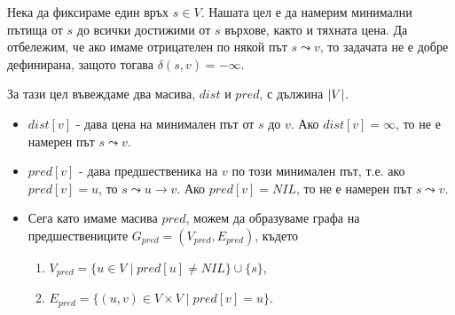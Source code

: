 Нека да фиксираме един връх $s \in V$.
Нашата цел е да намерим минимални пътища от $s$ до всички достижими от $s$ върхове,
както и тяхната цена. 
Да отбележим, че ако имаме отрицателен по някой път $s \leadsto v$, то задачата не е добре 
дефинирана, защото тогава $\delta(s,v) = -\infty$.

За тази цел въвеждаме два масива, $dist$ и $pred$, с дължина $\vert{V}\vert$.
\begin{itemize}
\item 
  $dist[v]$ - дава цена на минимален път от $s$ до $v$.
  Ако $dist[v] = \infty$, то не е намерен път $s\leadsto v$.
\item
  $pred[v]$ - дава предшественика на $v$ по този минимален път, т.е.
  ако $pred[v] = u$, то $s \leadsto u \to v$.
  Ако $pred[v] = NIL$, то не е намерен път $s \leadsto v$.
\item
  Сега като имаме масива $pred$, можем да образуваме графа на предшествениците $G_{pred} = (V_{pred},E_{pred})$, където
  \begin{enumerate}[]
  \item 
    $V_{pred} = \{u \in V \mid pred[u] \neq NIL \} \cup \{s\}$,
  \item
    $E_{pred} = \{(u,v) \in V\times V \mid pred[v] = u\}$.
  \end{enumerate}
\end{itemize}


